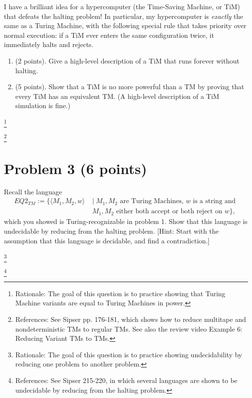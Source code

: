 \documentclass[letterpaper,11pt,twoside]{article}
\theoremstyle{plain}
\theoremstyle{definition}
\theoremstyle{remark}
\theoremstyle{restate}
\newcommand\blfootnote[1]{%
  \begingroup
  \renewcommand\thefootnote{}\footnote{#1}%
  \addtocounter{footnote}{-1}%
  \endgroup
}
\begin{document}
    I have a brilliant idea for a hypercomputer (the Time-Saving Machine, or TiM) that defeats the halting problem! In particular, my hypercomputer is \emph{exactly} the same as a Turing Machine, with the following special rule that takes priority over normal execution: if a TiM ever enters the same configuration twice, it immediately halts and rejects.
    
    \begin{enumerate}
        \item (2 points). Give a high-level description of a TiM that runs forever without halting.

        
        \item (5 points). Show that a TiM is no more powerful than a TM by proving that every TiM has an equivalent TM. (A high-level description of a TiM simulation is fine.)
        
    \end{enumerate}
    
    
    \blfootnote{ Rationale: The goal of this question is to practice showing that Turing Machine variants are equal to Turing Machines in power. }
    \blfootnote{ References: See Sipser pp. 176-181, which shows how to reduce multitape and nondeterministic TMs to regular TMs. See also the review video Example 6: Reducing Variant TMs to TMs. }

\clearpage
\section{Problem 3 (6 points)}
    Recall the language
    \begin{align*}
    EQ2_{TM} := \{\langle M_1, M_2, w \rangle \; &| \; M_1, M_2 \text{ are Turing Machines, } w \text{ is a string and } \\
    &M_1, M_2 \text{ either both accept or both reject on } w\},
    \end{align*}
    which you showed is Turing-recognizable in problem 1. Show that this language is undecidable by reducing from the halting problem. [Hint: Start with the assumption that this language is decidable, and find a contradiction.]
    
    \blfootnote{ Rationale: The goal of this question is to practice showing undecidability by reducing one problem to another problem. }
    \blfootnote{ References: See Sipser 215-220, in which several languages are shown to be undecidable by reducing from the halting problem. }
    
\clearpage
\end{document}
